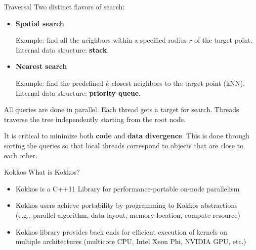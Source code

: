 \documentclass[final,hyperref={pdfpagelabels=false}]{beamer}
\begin{document}
\begin{frame}[t,fragile]
\begin{columns}[t]
\begin{column}{.480\textwidth}
\begin{block}{\centering Traversal}
  Two distinct flavors of search:

  \begin{itemize}
    \item \textbf{Spatial search}

      Example: find all the neighbors within a specified radius $r$ of the target point.
      Internal data structure: \textbf{stack}.

    \item \textbf{Nearest search}

      Example: find the predefined $k$ closest neighbors to the target point
      (kNN).
      Internal data structure: \textbf{priority queue}.

  \end{itemize}

  All queries are done in parallel. Each thread gets a target for search.
  Threads traverse the tree independently starting from the root
  node.

  It is critical to minimize both \textbf{code} and \textbf{data divergence}.
  This is done through sorting the queries so that local threads correspond to
  objects that are close to each other.

\end{block}

\begin{block}{\centering Kokkos}
  What is Kokkos?
  \begin{itemize}
    \item Kokkos is a C++11 Library for performance-portable on-node parallelism
    \item Kokkos users achieve portability by programming to Kokkos
      abstractions (e.g., parallel algorithm, data layout, memory location,
      compute resource)
    \item Kokkos library provides back ends for efficient execution of kernels
      on multiple architectures (multicore CPU, Intel Xeon Phi, NVIDIA GPU, etc.)
  \end{itemize}
\end{block}


\end{column}
\end{columns}
\end{frame}
\end{document}
